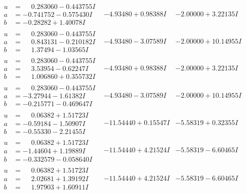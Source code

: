\documentclass[1p]{elsarticle_modified}
\theoremstyle{definition}
\begin{document}
$$\begin{array}{c|c|c}
\begin{aligned}
u &= \phantom{-}0.283060 - 0.443755 I \\
a &= -0.741752 - 0.575430 I \\
b &= -0.28282 + 1.40078 I\end{aligned}
 & -4.93480 + 0.98388 I & -2.00000 + 3.22135 I \\ \hline\begin{aligned}
u &= \phantom{-}0.283060 - 0.443755 I \\
a &= \phantom{-}0.843131 - 0.210182 I \\
b &= \phantom{-}1.37494 - 1.03565 I\end{aligned}
 & -4.93480 - 3.07589 I & -2.00000 + 10.14955 I \\ \hline\begin{aligned}
u &= \phantom{-}0.283060 - 0.443755 I \\
a &= \phantom{-}3.53954 - 0.62247 I \\
b &= \phantom{-}1.006860 + 0.355732 I\end{aligned}
 & -4.93480 + 0.98388 I & -2.00000 + 3.22135 I \\ \hline\begin{aligned}
u &= \phantom{-}0.283060 - 0.443755 I \\
a &= -3.27944 - 1.61382 I \\
b &= -0.215771 - 0.469647 I\end{aligned}
 & -4.93480 - 3.07589 I & -2.00000 + 10.14955 I \\ \hline\begin{aligned}
u &= \phantom{-}0.06382 + 1.51723 I \\
a &= -0.59184 - 1.50907 I \\
b &= -0.55330 - 2.21455 I\end{aligned}
 & -11.54440 + 0.15547 I & -5.58319 + 0.32355 I \\ \hline\begin{aligned}
u &= \phantom{-}0.06382 + 1.51723 I \\
a &= -1.44604 + 1.19889 I \\
b &= -0.332579 - 0.058640 I\end{aligned}
 & -11.54440 + 4.21524 I & -5.58319 - 6.60465 I \\ \hline\begin{aligned}
u &= \phantom{-}0.06382 + 1.51723 I \\
a &= \phantom{-}2.02681 + 1.39192 I \\
b &= \phantom{-}1.97903 + 1.60911 I\end{aligned}
 & -11.54440 + 4.21524 I & -5.58319 - 6.60465 I \\ \hline\begin{aligned}

\end{aligned}
\end{array}$$
\end{document}
